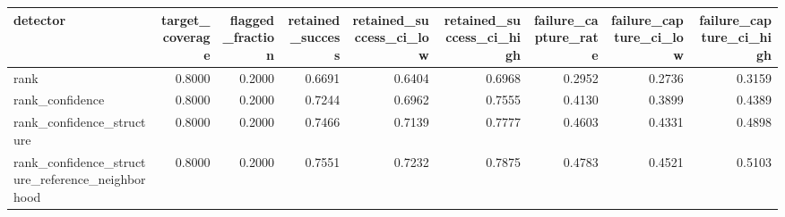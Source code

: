 \begin{tabular}{lrrrrrrrr}
\toprule
detector & target\_coverage & flagged\_fraction & retained\_success & retained\_success\_ci\_low & retained\_success\_ci\_high & failure\_capture\_rate & failure\_capture\_ci\_low & failure\_capture\_ci\_high \\
\midrule
rank & 0.8000 & 0.2000 & 0.6691 & 0.6404 & 0.6968 & 0.2952 & 0.2736 & 0.3159 \\
rank\_confidence & 0.8000 & 0.2000 & 0.7244 & 0.6962 & 0.7555 & 0.4130 & 0.3899 & 0.4389 \\
rank\_confidence\_structure & 0.8000 & 0.2000 & 0.7466 & 0.7139 & 0.7777 & 0.4603 & 0.4331 & 0.4898 \\
rank\_confidence\_structure\_reference\_neighborhood & 0.8000 & 0.2000 & 0.7551 & 0.7232 & 0.7875 & 0.4783 & 0.4521 & 0.5103 \\
\bottomrule
\end{tabular}
